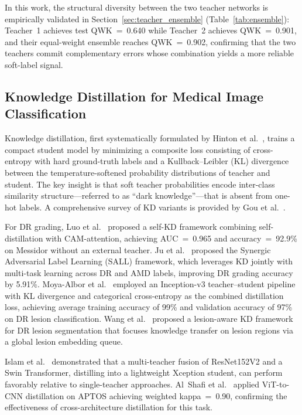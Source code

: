 \documentclass[a4paper,fleqn]{cas-dc}
\begin{document}
In this work, the structural diversity between the two teacher networks is empirically validated in Section~\ref{sec:teacher_ensemble} (Table~\ref{tab:ensemble}): Teacher~1 achieves test QWK~=~0.640 while Teacher~2 achieves QWK~=~0.901, and their equal-weight ensemble reaches QWK~=~0.902, confirming that the two teachers commit complementary errors whose combination yields a more reliable soft-label signal.

\subsection{Knowledge Distillation for Medical Image Classification}

Knowledge distillation, first systematically formulated by Hinton et al.\ \cite{hinton2015}, trains a compact student model by minimizing a composite loss consisting of cross-entropy with hard ground-truth labels and a Kullback--Leibler (KL) divergence between the temperature-softened probability distributions of teacher and student. The key insight is that soft teacher probabilities encode inter-class similarity structure---referred to as ``dark knowledge''---that is absent from one-hot labels. A comprehensive survey of KD variants is provided by Gou et al.\ \cite{gou2021}.

For DR grading, Luo et al.\ \cite{luo2020} proposed a self-KD framework combining self-distillation with CAM-attention, achieving AUC~=~0.965 and accuracy~=~92.9\% on Messidor without an external teacher. Ju et al.\ \cite{ju2021} proposed the Synergic Adversarial Label Learning (SALL) framework, which leverages KD jointly with multi-task learning across DR and AMD labels, improving DR grading accuracy by 5.91\%. Moya-Albor et al.\ \cite{moya2024} employed an Inception-v3 teacher--student pipeline with KL divergence and categorical cross-entropy as the combined distillation loss, achieving average training accuracy of 99\% and validation accuracy of 97\% on DR lesion classification. Wang et al.\ \cite{wang2024} proposed a lesion-aware KD framework for DR lesion segmentation that focuses knowledge transfer on lesion regions via a global lesion embedding queue.

Islam et al.\ \cite{islam2023} demonstrated that a multi-teacher fusion of ResNet152V2 and a Swin Transformer, distilling into a lightweight Xception student, can perform favorably relative to single-teacher approaches. Al~Shafi et al.\ \cite{alshafi2024} applied ViT-to-CNN distillation on APTOS achieving weighted kappa~=~0.90, confirming the effectiveness of cross-architecture distillation for this task.
\end{document}
